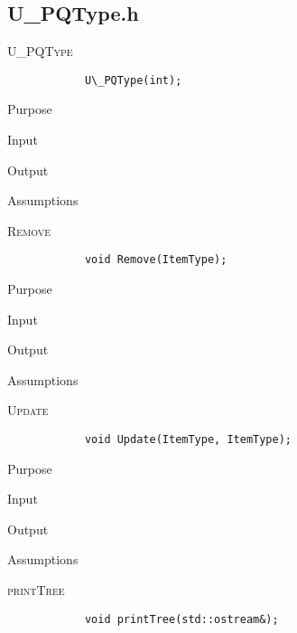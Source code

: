\documentclass[pdftex, 12pt]{article}
\begin{document}
\subsection{U\_PQType.h}
\begin{description}

	\item{\textsc{U\_PQType}}
		\begin{lstlisting}
			U\_PQType(int);
		\end{lstlisting}
		\begin{description}

			\item{Purpose}

			\item{Input}

			\item{Output}

			\item{Assumptions}

		\end{description}
	\item{\textsc{Remove}}
		\begin{lstlisting}
			void Remove(ItemType);
		\end{lstlisting}
		\begin{description}

			\item{Purpose}

			\item{Input}

			\item{Output}

			\item{Assumptions}

		\end{description}
	\item{\textsc{Update}}
		\begin{lstlisting}
			void Update(ItemType, ItemType);
		\end{lstlisting}
		\begin{description}

			\item{Purpose}

			\item{Input}

			\item{Output}

			\item{Assumptions}

		\end{description}
	\item{\textsc{printTree}}
		\begin{lstlisting}
			void printTree(std::ostream&);
		\end{lstlisting}
		\begin{description}


\end{description}
\end{description}
\end{document}
